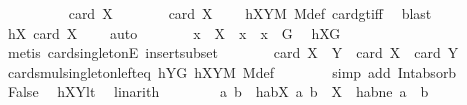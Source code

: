 \begin{isabellebody}
\ \ \ \ \isamarkupfalse%
\ {\isachardoublequoteopen}\ {\isasymnot}\ {}\ {\isasymle}\ card\ X{\isachardoublequoteclose}\isanewline
\ \ \ \ \isamarkupfalse%
\ \isamarkupfalse%
\ {\isachardoublequoteopen}card\ X\ {\isachargreater}{\kern0pt}\ {}{\isachardoublequoteclose}\ \isamarkupfalse%
\ hXYM\ M{\isacharunderscore}{\kern0pt}def\ card{\isacharunderscore}{\kern0pt}gt{\isacharunderscore}{\kern0pt}{}{\isacharunderscore}{\kern0pt}iff\ \isamarkupfalse%
\ blast\isanewline
\ \ \ \ \isamarkupfalse%
\ \isamarkupfalse%
\ hX{}{\isacharcolon}{\kern0pt}\ {\isachardoublequoteopen}card\ X\ {\isacharequal}{\kern0pt}\ {}{\isachardoublequoteclose}\ \isamarkupfalse%
\ auto\isanewline
\ \ \ \ \isamarkupfalse%
\ \isamarkupfalse%
\ x\ \ {\isachardoublequoteopen}X\ {\isacharequal}{\kern0pt}\ {\isacharbraceleft}{\kern0pt}x{\isacharbraceright}{\kern0pt}{\isachardoublequoteclose}\ \ {\isachardoublequoteopen}x\ {\isasymin}\ G{\isachardoublequoteclose}\ \isamarkupfalse%
\ hXG\ \isamarkupfalse%
\ {\isacharparenleft}{\kern0pt}metis\ card{\isacharunderscore}{\kern0pt}{}{\isacharunderscore}{\kern0pt}singletonE\ insert{\isacharunderscore}{\kern0pt}subset{\isacharparenright}{\kern0pt}\isanewline
\ \ \ \ \isamarkupfalse%
\ \isamarkupfalse%
\ {\isachardoublequoteopen}card\ {\isacharparenleft}{\kern0pt}X\ {\isasymcdots}\ Y{\isacharparenright}{\kern0pt}\ {\isacharequal}{\kern0pt}\ card\ X\ {\isacharplus}{\kern0pt}\ card\ Y\ {\isacharminus}{\kern0pt}\ {}{\isachardoublequoteclose}\ \isamarkupfalse%
\ card{\isacharunderscore}{\kern0pt}smul{\isacharunderscore}{\kern0pt}singleton{\isacharunderscore}{\kern0pt}left{\isacharunderscore}{\kern0pt}eq\ hYG\ hXYM\ M{\isacharunderscore}{\kern0pt}def\isanewline
\ \ \ \ \ \ \isamarkupfalse%
\ {\isacharparenleft}{\kern0pt}simp\ add{\isacharcolon}{\kern0pt}\ Int{\isacharunderscore}{\kern0pt}absorb{}{\isacharparenright}{\kern0pt}\isanewline
\ \ \ \ \isamarkupfalse%
\ \isamarkupfalse%
\ False\ \isamarkupfalse%
\ hXYlt\ \isamarkupfalse%
\ linarith\isanewline
\ \ \isamarkupfalse%
\isanewline
\ \ \isamarkupfalse%
\ \isamarkupfalse%
\ a\ b\ \ habX{\isacharcolon}{\kern0pt}\ {\isachardoublequoteopen}{\isacharbraceleft}{\kern0pt}a{\isacharcomma}{\kern0pt}\ b{\isacharbraceright}{\kern0pt}\ {\isasymsubseteq}\ X{\isachardoublequoteclose}\ \ habne{\isacharcolon}{\kern0pt}\ {\isachardoublequoteopen}a\ {\isasymnoteq}\ b{\isachardoublequoteclose}\ \isamarkupfalse%

\end{isabellebody}
